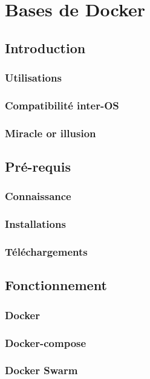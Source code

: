 \chapter{Bases de Docker}
\label{ch:docker}

\section{Introduction}
\subsection{Utilisations}
\subsection{Compatibilité inter-OS}
\subsection{Miracle or illusion}

\section{Pré-requis}
\subsection{Connaissance}
\subsection{Installations}
\subsection{Téléchargements}

\section{Fonctionnement}
\subsection{Docker}
\subsection{Docker-compose}
\subsection{Docker Swarm}

